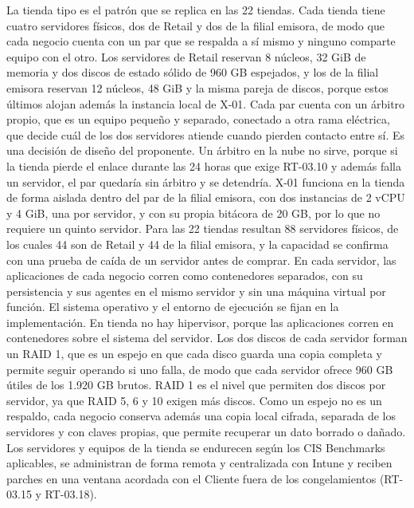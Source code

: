 \documentclass[11pt]{article}
\begin{document}
La tienda tipo es el patrón que se replica en las 22 tiendas. Cada tienda tiene cuatro servidores físicos, dos de Retail y dos de la filial emisora, de modo que cada negocio cuenta con un par que se respalda a sí mismo y ninguno comparte equipo con el otro. Los servidores de Retail reservan 8 núcleos, 32 GiB de memoria y dos discos de estado sólido de 960 GB espejados, y los de la filial emisora reservan 12 núcleos, 48 GiB y la misma pareja de discos, porque estos últimos alojan además la instancia local de X-01. Cada par cuenta con un árbitro propio, que es un equipo pequeño y separado, conectado a otra rama eléctrica, que decide cuál de los dos servidores atiende cuando pierden contacto entre sí. Es una decisión de diseño del proponente. Un árbitro en la nube no sirve, porque si la tienda pierde el enlace durante las 24 horas que exige RT-03.10 y además falla un servidor, el par quedaría sin árbitro y se detendría. X-01 funciona en la tienda de forma aislada dentro del par de la filial emisora, con dos instancias de 2 vCPU y 4 GiB, una por servidor, y con su propia bitácora de 20 GB, por lo que no requiere un quinto servidor. Para las 22 tiendas resultan 88 servidores físicos, de los cuales 44 son de Retail y 44 de la filial emisora, y la capacidad se confirma con una prueba de caída de un servidor antes de comprar. En cada servidor, las aplicaciones de cada negocio corren como contenedores separados, con su persistencia y sus agentes en el mismo servidor y sin una máquina virtual por función. El sistema operativo y el entorno de ejecución se fijan en la implementación. En tienda no hay hipervisor, porque las aplicaciones corren en contenedores sobre el sistema del servidor. Los dos discos de cada servidor forman un RAID 1, que es un espejo en que cada disco guarda una copia completa y permite seguir operando si uno falla, de modo que cada servidor ofrece 960 GB útiles de los 1.920 GB brutos. RAID 1 es el nivel que permiten dos discos por servidor, ya que RAID 5, 6 y 10 exigen más discos. Como un espejo no es un respaldo, cada negocio conserva además una copia local cifrada, separada de los servidores y con claves propias, que permite recuperar un dato borrado o dañado. Los servidores y equipos de la tienda se endurecen según los CIS Benchmarks aplicables, se administran de forma remota y centralizada con Intune y reciben parches en una ventana acordada con el Cliente fuera de los congelamientos (RT-03.15 y RT-03.18).
\end{document}

